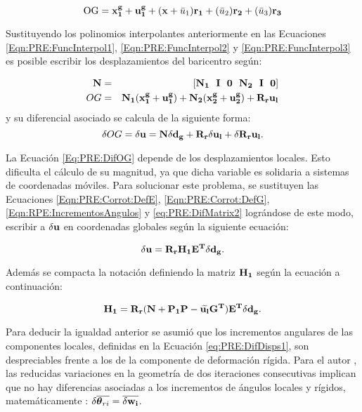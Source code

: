 \begin{equation}\label{Eqn:PRE:DispsOG}
 	\text{OG} = \bf{x}_1^g+\bf{u}_1^g + (x+\text{$\bar{u}_1$}) \bf{r_1} + (\text{$\bar{u}_2$})\bf{r_2}+ (\text{$\bar{u}_3$})\bf{r_3}
\end{equation}

Sustituyendo los polinomios interpolantes anteriormente en las Ecuaciones \eqref{Eqn:PRE:FuncInterpol1}, \eqref{Eqn:PRE:FuncInterpol2} y \eqref{Eqn:PRE:FuncInterpol3} es posible escribir los desplazamientos del baricentro según: 

\begin{eqnarray}
	\bf{N}&=&[\bf{N_1}~~ \bf{I}~~ \bf{0}~~ \bf{N_2}~~ \bf{I}~~ \bf{0}]\\
	OG    &=& \bf{N_1}(\bf{x}_1^g+\bf{u}_1^g)+\bf{N_2}(\bf{x}_2^g+\bf{u}_2^g)+ \bf{R}_r \bf{u}_l
\end{eqnarray}
y su diferencial asociado se calcula de la siguiente forma:
\begin{equation}
	\label{Eq:PRE:DifOG}
	\delta OG = \delta \bf{u} = \bf{N}\delta\bf{d}_g+\bf{R}_r \delta\bf{u}_l + \delta \bf{R}_r \bf{u}_l.
\end{equation}

 La Ecuación \eqref{Eq:PRE:DifOG} depende de los desplazamientos locales. Esto dificulta el cálculo de su magnitud, ya que dicha variable es solidaria a sistemas de coordenadas móviles. Para solucionar este problema, se sustituyen las Ecuaciones \eqref{Eqn:PRE:Corrot:DefE}, \eqref{Eqn:PRE:Corrot:DefG}, \eqref{Eqn:RPE:IncrementosAngulos} y \eqref{eq:PRE:DifMatrix2} lográndose de este modo, escribir a $ \delta \bf{u}$ en coordenadas globales según la siguiente ecuación:

 \begin{equation}
	\label{Eqn:PRE:DifUDefH1}
	\delta \bf{u}= \bf{R}_r \bf{H}_1 \bf{E}^T \delta \bf{d}_g.
\end{equation}

 Además se compacta la notación definiendo la matriz $\bf{H}_1$ según la ecuación a continuación:
 
  \begin{equation}
 	\bf{H}_1 = \bf{R}_r(\bf{N}+\bf{P}_1\bf{P}-\widetilde{\bf{u}_l}\bf{G}^T)\bf{E}^T \delta \bf{d}_g.
 \end{equation}


 Para deducir la igualdad anterior se asumió que los incrementos angulares de las componentes locales, definidas en la Ecuación \eqref{eq:PRE:DifDisps1}, son despreciables frente a los de la componente de deformación rígida. Para el autor \cite{Le2014}, las reducidas variaciones en la geometría de dos iteraciones consecutivas implican que no hay diferencias asociadas a los incrementos de ángulos locales y rígidos, matemáticamente : $\delta \overline{\boldsymbol{\theta}_{ri}}= \overline{\delta \bf{w}_i}$.

